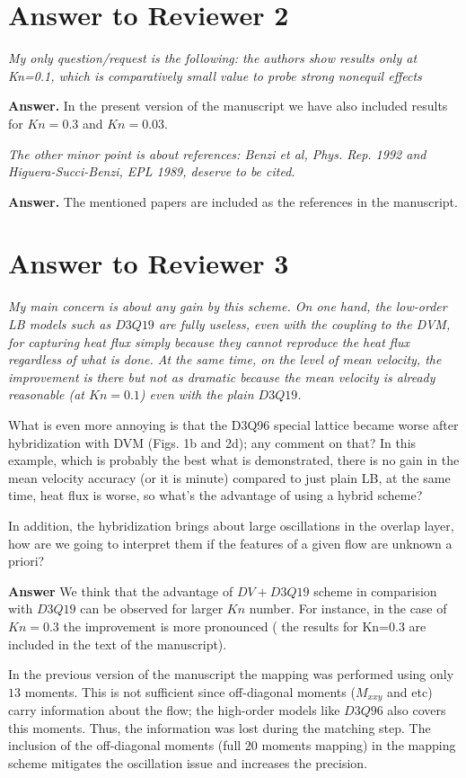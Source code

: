 \documentclass{article}
\begin{document}
\section*{ Answer to Reviewer 2}

{\it My only question/request is the following: the authors show results only at Kn=0.1, which is 
comparatively small value to probe strong nonequil effects}

{\bf Answer.} In the  present version of the  manuscript we have also included results for $Kn=0.3$ and $Kn=0.03$.

{\it The other minor point is about references:
Benzi et al, Phys. Rep. 1992 and Higuera-Succi-Benzi, EPL 1989, deserve to be cited.}

{\bf Answer.} The mentioned papers  are  included as the references in the manuscript.

\section*{ Answer to Reviewer 3}

{\it My main concern is about any gain by this scheme. On one hand, the low-order LB models such as $D3Q19$ are fully useless, even with the coupling to the DVM, for capturing heat flux simply because they cannot reproduce the heat flux regardless of what is done. At the same time, on the level of mean velocity, the improvement is there but not as dramatic because the mean velocity is already reasonable (at $Kn=0.1$) even with the plain $D3Q19$. 

What is even more annoying is that the D3Q96 special lattice became worse after hybridization with DVM (Figs. 1b and 2d); any comment on that?
In this example, which is probably the best what is demonstrated, there is no gain in the mean velocity accuracy (or it is minute) compared to just plain LB, at the same time, heat flux is worse, so what's the advantage of using a hybrid scheme?

In addition, the hybridization brings about large oscillations in the overlap layer, how are we going to interpret them if the features of a given flow are unknown a priori?}

{\bf Answer}
 We think that the advantage  of  $DV+D3Q19$ scheme in comparision with $D3Q19$ can be  observed for  larger  $Kn$  number. For instance, in the  case  of $Kn=0.3$ the improvement is  more pronounced ( the results for Kn=0.3 are  included  in the  text
 of the manuscript).
 
 In the  previous version of the manuscript the mapping was  performed  using  only $13$ moments.  This  is not sufficient since  off-diagonal moments ($M_{xxy}$ and etc) carry information about the flow;  the high-order models  like $D3Q96$ also covers this moments. Thus, the  information was lost during  the  matching step. The  inclusion of  the  off-diagonal moments (full $20$ moments mapping) in the mapping scheme mitigates the oscillation issue and  increases the precision.  
 
\end{document}
